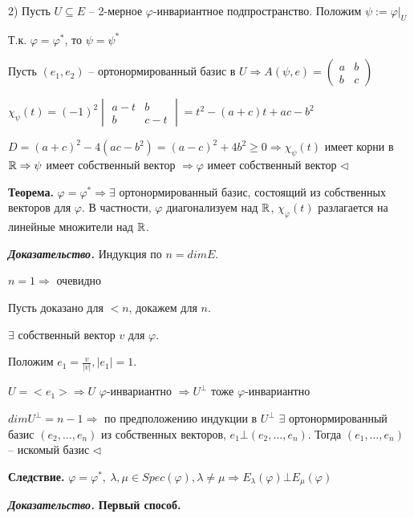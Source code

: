 2) Пусть $U \subseteq E$ -- 2-мерное $\varphi$-инвариантное подпространство. Положим $\psi := \varphi|_U$

Т.к. $\varphi = \varphi^*$, то $\psi = \psi^*$

Пусть $(e_1, e_2)$ -- ортонормированный базис в $U \Rightarrow A(\psi, e) = \begin{pmatrix} a & b \\ b & c \end{pmatrix}$

$\chi_{\psi} (t) = (-1)^2 \begin{vmatrix}
a- t & b \\ b & c - t \end{vmatrix} = t^2 - (a + c) t + ac - b^2$

$D = (a+c)^2 - 4 (ac - b^2) = (a-c)^2 +4b^2 \geq 0 \Rightarrow \chi_{\psi} (t)$ имеет корни в $\mathbb{R} \Rightarrow \psi$ имеет собственный вектор $\Rightarrow \varphi$ имеет собственный вектор $\lhd$

\vspace{\baselineskip}
\textbf{Теорема.} $\varphi = \varphi^* \Rightarrow \exists$ ортонормированный базис, состоящий из собственных векторов для $\varphi$. В частности, $\varphi$ диагонализуем над $\mathbb{R}$, $\chi_{\varphi} (t)$ разлагается на линейные множители над $\mathbb{R}$.

\vspace{\baselineskip}
\textbf{\textit{Доказательство.}} Индукция по $n = dim E$.

$n = 1 \Rightarrow$ очевидно

Пусть доказано для $<n$, докажем для $n$.

$\exists$ собственный вектор $v$ для $\varphi$.

Положим $e_1 = \frac{v}{|v|}, |e_1| = 1$.

$U = <e_1> \Rightarrow U$ $\varphi$-инвариантно $\Rightarrow U^{\bot}$ тоже $\varphi$-инвариантно

$dim U^{\bot} = n - 1 \Rightarrow$ по предположению индукции в $U^{\bot}$  $\exists$ ортонормированный базис $(e_2, \dots, e_n)$ из собственных векторов, $e_1 \bot (e_2, \dots, e_n)$. Тогда $(e_1, \dots, e_n)$ -- искомый базис $\lhd$

\vspace{\baselineskip}
\textbf{Следствие.} $\varphi = \varphi^*, \ \lambda, \mu \in Spec(\varphi), \lambda \neq \mu \Rightarrow E_{\lambda} (\varphi) \bot E_{\mu} (\varphi)$

\vspace{\baselineskip}
\textbf{\textit{Доказательство.}} \textbf{Первый способ.}

